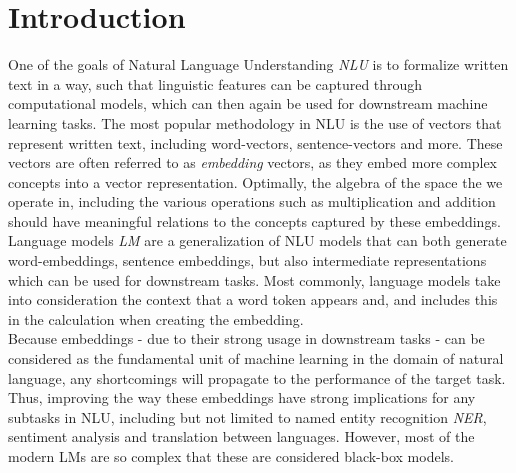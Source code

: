 \documentclass[a4paper,12pt,twoside,openright]{report}
\begin{document}
\pagestyle{empty}
\singlespacing

\onehalfspacing

\singlespacing


\setcounter{page}{0}
\pagestyle{plain}
\tableofcontents
\listoffigures
\listoftables

\onehalfspacing

\newcommand{\norm}[1]{\left\lVert#1\right\rVert}
\newcommand{\bracket}[1]{\left|#1\right|}
\newcommand{\absdet}[1]{\left|#1\right|}
\newcommand{\bftab}{\fontseries{b}\selectfont}

\setcounter{page}{1} 

\newpage
\chapter{Introduction}
 
One of the goals of Natural Language Understanding \textit{NLU} is to formalize written text in a way, such that linguistic features can be captured through computational models, which can then again be used for downstream machine learning tasks.
The most popular methodology in NLU is the use of vectors that represent written text, including word-vectors, sentence-vectors and more. 
These vectors are often referred to as \textit{embedding} vectors, as they embed more complex concepts into a vector representation.
Optimally, the algebra of the space the we operate in, including the various operations such as multiplication and addition should have meaningful relations to the concepts captured by these embeddings. \\

Language models \textit{LM} are a generalization of NLU models that can both generate word-embeddings, sentence embeddings, but also intermediate representations which can be used for downstream tasks.
Most commonly, language models take into consideration the context that a word token appears and, and includes this in the calculation when creating the embedding. \\

Because embeddings - due to their strong usage in downstream tasks - can be considered as the fundamental unit of machine learning in the domain of natural language, any shortcomings will propagate to the performance of the target task.
Thus, improving the way these embeddings have strong implications for any subtasks in NLU, including but not limited to named entity recognition \textit{NER}, sentiment analysis and translation between languages. 
However, most of the modern LMs are so complex that these are considered black-box models.
\\
\end{document}

